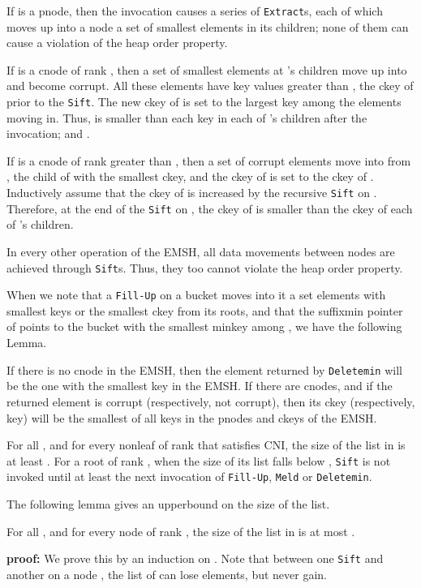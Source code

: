 If  is a pnode, then the invocation causes a series of {\tt Extract}s, each
	of which moves up into a node a set of smallest elements in its children;
	none of them can cause a violation of the heap order property.

If  is a cnode of rank , then a set of smallest elements at 's children
	move up into  and become corrupt. 
All these elements have key values greater than , the ckey of  prior to the {\tt Sift}.
The new ckey of  is set to the largest key  among the elements moving in. 
Thus,  is smaller than each key in each of 's
	children after the invocation; and . 

If  is a cnode of rank greater than , then a set of corrupt elements move
	into  from , the child of  with the smallest ckey, and the ckey
	of  is set to the ckey of .
Inductively assume that the ckey of  is increased by the recursive {\tt Sift} on .  
Therefore, at the end of the {\tt Sift} on , the ckey of  is smaller than the
	ckey of each of 's children.

In every other operation of the EMSH, all data movements between nodes 
	are achieved through {\tt Sift}s.
Thus, they too cannot violate the heap order property.

When we note that a {\tt Fill-Up} on a bucket  moves into it
	a set elements with smallest keys or the smallest ckey from
	its roots, and that 
	the suffixmin pointer of  points to the bucket with the smallest minkey
	among , we have the following Lemma. 

\begin{lemma}
If there is no cnode in the EMSH, then the element returned by {\tt Deletemin}
will be the one with the smallest key in the EMSH.
If there are cnodes, and if the returned element is corrupt (respectively, not corrupt), 
then its ckey (respectively, key) will be the smallest
of all keys in the pnodes and ckeys of the EMSH.
\end{lemma}

For all , and for every nonleaf  of rank  that satisfies CNI, 
the size of the list in  is at least .
For a root  of rank , when the size of its list falls below , {\tt Sift} is not invoked until at least the next invocation
	of {\tt Fill-Up}, {\tt Meld} or {\tt Deletemin}.


The following lemma gives an upperbound on the size of the list.

\begin{lemma}
\label{lem:3sk}
For all , and for every node  of rank , 
the size of the list in  is at most .
\end{lemma}
{\bf proof:}
We prove this by an induction on .
Note that between one {\tt Sift} and another on a node , the list of  can
lose elements, but never gain.  

